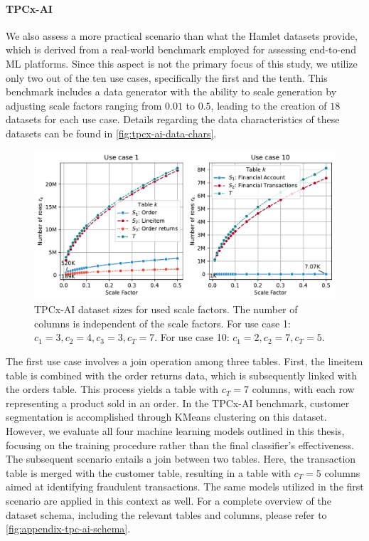 \paragraph{TPCx-AI \cite{tpcx-ai}} We also assess a more practical scenario than what the Hamlet datasets provide, which is derived from a real-world benchmark employed for assessing end-to-end ML platforms. Since this aspect is not the primary focus of this study, we utilize only two out of the ten use cases, specifically the first and the tenth. This benchmark includes a data generator with the ability to scale generation by adjusting scale factors ranging from $0.01$ to $0.5$, leading to the creation of $18$ datasets for each use case. Details regarding the data characteristics of these datasets can be found in \autoref{fig:tpcx-ai-data-chars}.

\begin{figure}
    \centering
    \includegraphics[width=\linewidth]{chapters/06_evaluation/figures/tpcx-ai-data-chars.pdf}
    \caption[TPCx-AI dataset sizes for used scale factors.]{TPCx-AI dataset sizes for used scale factors. The number of columns is independent of the scale factors. For use case 1: $c_1=3, c_2=4, c_3=3, c_T=7$. For use case 10: $c_1=2, c_2=7, c_T=5$.}
    \label{fig:tpcx-ai-data-chars}
\end{figure}


The first use case involves a join operation among three tables. First, the lineitem table is combined with the order returns data, which is subsequently linked with the orders table. This process yields a table with $c_T=7$ columns, with each row representing a product sold in an order. In the TPCx-AI benchmark, customer segmentation is accomplished through KMeans clustering on this dataset. However, we evaluate all four machine learning models outlined in this thesis, focusing on the training procedure rather than the final classifier's effectiveness. The subsequent scenario entails a join between two tables. Here, the transaction table is merged with the customer table, resulting in a table with $c_T=5$ columns aimed at identifying fraudulent transactions. The same models utilized in the first scenario are applied in this context as well. For a complete overview of the dataset schema, including the relevant tables and columns, please refer to \autoref{fig:appendix-tpc-ai-schema}.

